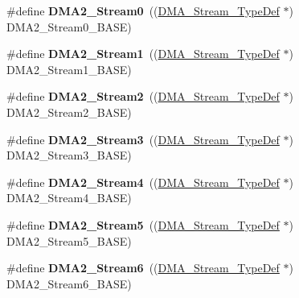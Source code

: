 \begin{DoxyCompactItemize}
\item 
\hypertarget{group___peripheral__declaration_ga3a2efe5fd7a7a79be3b08a1670bbd016}{\#define {\bfseries D\-M\-A2\-\_\-\-Stream0}~((\hyperlink{struct_d_m_a___stream___type_def}{D\-M\-A\-\_\-\-Stream\-\_\-\-Type\-Def} $\ast$) D\-M\-A2\-\_\-\-Stream0\-\_\-\-B\-A\-S\-E)}\label{group___peripheral__declaration_ga3a2efe5fd7a7a79be3b08a1670bbd016}

\item 
\hypertarget{group___peripheral__declaration_gae96f15d34d3c41c16fce69bc2878151a}{\#define {\bfseries D\-M\-A2\-\_\-\-Stream1}~((\hyperlink{struct_d_m_a___stream___type_def}{D\-M\-A\-\_\-\-Stream\-\_\-\-Type\-Def} $\ast$) D\-M\-A2\-\_\-\-Stream1\-\_\-\-B\-A\-S\-E)}\label{group___peripheral__declaration_gae96f15d34d3c41c16fce69bc2878151a}

\item 
\hypertarget{group___peripheral__declaration_ga71bb410664b861ff0520f08976e24ee1}{\#define {\bfseries D\-M\-A2\-\_\-\-Stream2}~((\hyperlink{struct_d_m_a___stream___type_def}{D\-M\-A\-\_\-\-Stream\-\_\-\-Type\-Def} $\ast$) D\-M\-A2\-\_\-\-Stream2\-\_\-\-B\-A\-S\-E)}\label{group___peripheral__declaration_ga71bb410664b861ff0520f08976e24ee1}

\item 
\hypertarget{group___peripheral__declaration_gaa6ead6a5ca6b8df70b5505aaeec6fd2e}{\#define {\bfseries D\-M\-A2\-\_\-\-Stream3}~((\hyperlink{struct_d_m_a___stream___type_def}{D\-M\-A\-\_\-\-Stream\-\_\-\-Type\-Def} $\ast$) D\-M\-A2\-\_\-\-Stream3\-\_\-\-B\-A\-S\-E)}\label{group___peripheral__declaration_gaa6ead6a5ca6b8df70b5505aaeec6fd2e}

\item 
\hypertarget{group___peripheral__declaration_gae32674772021620800275dd3b6d62c2f}{\#define {\bfseries D\-M\-A2\-\_\-\-Stream4}~((\hyperlink{struct_d_m_a___stream___type_def}{D\-M\-A\-\_\-\-Stream\-\_\-\-Type\-Def} $\ast$) D\-M\-A2\-\_\-\-Stream4\-\_\-\-B\-A\-S\-E)}\label{group___peripheral__declaration_gae32674772021620800275dd3b6d62c2f}

\item 
\hypertarget{group___peripheral__declaration_gac40f58718761251875b5a897287efd83}{\#define {\bfseries D\-M\-A2\-\_\-\-Stream5}~((\hyperlink{struct_d_m_a___stream___type_def}{D\-M\-A\-\_\-\-Stream\-\_\-\-Type\-Def} $\ast$) D\-M\-A2\-\_\-\-Stream5\-\_\-\-B\-A\-S\-E)}\label{group___peripheral__declaration_gac40f58718761251875b5a897287efd83}

\item 
\hypertarget{group___peripheral__declaration_ga11a00b283e0911cd427e277e5a314ccc}{\#define {\bfseries D\-M\-A2\-\_\-\-Stream6}~((\hyperlink{struct_d_m_a___stream___type_def}{D\-M\-A\-\_\-\-Stream\-\_\-\-Type\-Def} $\ast$) D\-M\-A2\-\_\-\-Stream6\-\_\-\-B\-A\-S\-E)}\label{group___peripheral__declaration_ga11a00b283e0911cd427e277e5a314ccc}


\end{DoxyCompactItemize}
